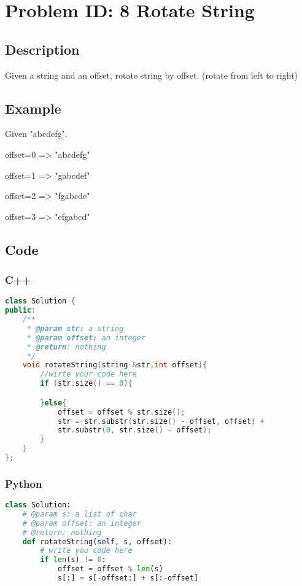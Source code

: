 \section{Problem ID: 8  Rotate String}
\subsection{Description}
Given a string and an offset, rotate string by offset. (rotate from left to right)

\subsection{Example}
Given "abcdefg".

offset=0 => "abcdefg"

offset=1 => "gabcdef"

offset=2 => "fgabcde"

offset=3 => "efgabcd"

\subsection{Code}
\scriptsize
\subsubsection{C++}
\begin{lstlisting}[language=C++]
class Solution {
public:
    /**
     * @param str: a string
     * @param offset: an integer
     * @return: nothing
     */
    void rotateString(string &str,int offset){
        //wirte your code here
        if (str.size() == 0){

        }else{
            offset = offset % str.size();
            str = str.substr(str.size() - offset, offset) + 
            str.substr(0, str.size() - offset);
        }
    }
};
\end{lstlisting}

\subsubsection{Python}
\begin{lstlisting}[language=Python]
class Solution:
    # @param s: a list of char
    # @param offset: an integer
    # @return: nothing
    def rotateString(self, s, offset):
	    # write you code here
	    if len(s) != 0:
	        offset = offset % len(s)
	        s[:] = s[-offset:] + s[:-offset]
\end{lstlisting}
\normalsize 